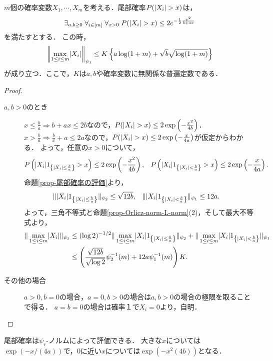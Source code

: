 \documentclass[uplatex,dvipdfmx]{jsreport}
\begin{document}
\begin{lemma}\label{lemma-尾部確率の評価}
    $m$個の確率変数$X_1,\cdots,X_m$を考える．尾部確率$P(\lvert X_i\rvert>x)$は，
    \[\exists_{a,b\ge 0}\;\forall_{i\in[m]}\;\forall_{x>0}\;P(\lvert X_i\rvert>x)\le 2e^{-\frac{1}{2}\frac{x^2}{b+ax}}\]
    を満たすとする．
    この時，
    \[\left\|\max_{1\le i\le m}\lvert X_i\rvert\right\|_{\psi_1}\le K\left\{a\log(1+m)+\sqrt{b}\sqrt{\log(1+m)}\right\}\]
    が成り立つ．ここで，$K$は$a,b$や確率変数に無関係な普遍定数である．
\end{lemma}
\begin{proof}\mbox{}
    \begin{description}
        \item[$a,b>0$のとき] 
        $x\le\frac{b}{a}\Rightarrow b+ax\le 2b$なので，$P(\lvert X_i\rvert>x)\le2\exp\left(-\frac{x^2}{4b}\right)$．$x>\frac{b}{a}\Rightarrow\frac{b}{x}+a\le 2a$なので，$P(\lvert X_i\rvert>x)\le 2\exp\left(-\frac{x}{4a}\right)$が仮定からわかる．
        よって，任意の$x>0$について，
        \begin{align*}
            P\left(\lvert X_i\rvert1_{\left\{\lvert X_i\rvert\le\frac{b}{a}\right\}}>x\right)&\le 2\exp\left(-\frac{x^2}{4b}\right),&P\left(\lvert X_i\rvert1_{\left\{\lvert X_i\rvert<\frac{b}{a}\right\}}>x\right)&\le 2\exp\left(-\frac{x}{4a}\right).
        \end{align*}
        命題\ref{prop-尾部確率の評価}より，
        \begin{align*}
            \|\lvert X_i\rvert1_{\left\{\lvert X_i\rvert\le\frac{b}{a}\right\}}\|_{\psi_2}&\le\sqrt{12b},&\|\lvert X_i\rvert1_{\left\{\lvert X_i\rvert<\frac{b}{a}\right\}}\|_{\psi_1}&\le 12a.
        \end{align*}
        よって，三角不等式と命題\ref{prop-Orlicz-norm-L-norm}(2)，そして最大不等式より，
        \begin{align*}
            \|\max_{1\le i\le m}\lvert X_i\rvert\|_{\psi_1}&\le(\log 2)^{-1/2}\|\max_{1\le i\le m}\lvert X_i\rvert1_{\left\{\lvert X_i\rvert\le\frac{b}{a}\right\}}\|_{\psi_2}+\|\max_{1\le i\le m}\lvert X_i\rvert1_{\left\{\lvert X_i\rvert<\frac{b}{a}\right\}}\|_{\psi_1}\\
            &\le\left(\frac{\sqrt{12b}}{\sqrt{\log 2}}\psi^{-1}_2(m)+12a\psi^{-1}_1(m)\right)K.
        \end{align*}
        \item[その他の場合] 
        $a>0,b=0$の場合，$a=0,b>0$の場合は$a,b>0$の場合の極限を取ることで得る．
        $a=b=0$の場合は確率１で$X_i=0$より，自明．
    \end{description}
\end{proof}
\begin{remarks}
    尾部確率は$\psi_r$-ノルムによって評価できる．
    大きな$x$については$\exp(-x/(4a))$で，$0$に近い$x$については$\exp(-x^2(4b))$となる．
\end{remarks}
\end{document}
